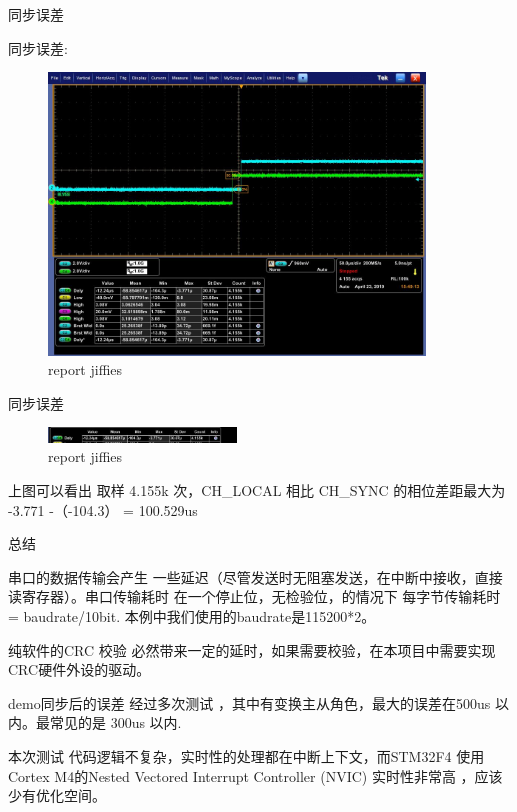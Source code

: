 \begin{frame}[fragile]{同步误差}

同步误差:

  \begin{figure}[htbp]
  \begin{center}
  \includegraphics[width=10cm]{img/mis3}
  \caption{report jiffies}
  \label{report}
  \end{center}
  \vspace{-0.5em}
  \end{figure}

\end{frame}


\begin{frame}[fragile]{同步误差}

  \begin{figure}[htbp]
  \begin{center}
  \includegraphics[width=5cm]{img/delay}
  \caption{report jiffies}
  \label{report}
  \end{center}
  \vspace{-0.5em}
  \end{figure}

上图可以看出 取样 4.155k 次，CH\_LOCAL 相比 CH\_SYNC 的相位差距最大为
-3.771 -（-104.3） = 100.529us

\end{frame}


\begin{frame}[fragile]{总结}

串口的数据传输会产生 一些延迟（尽管发送时无阻塞发送，在中断中接收，直接读寄存器）。串口传输耗时
在一个停止位，无检验位，的情况下 每字节传输耗时 =  baudrate/10bit. 本例中我们使用的baudrate是115200*2。

纯软件的CRC 校验 必然带来一定的延时，如果需要校验，在本项目中需要实现CRC硬件外设的驱动。

demo同步后的误差 经过多次测试 ，其中有变换主从角色，最大的误差在500us 以内。最常见的是
300us 以内.

本次测试 代码逻辑不复杂，实时性的处理都在中断上下文，而STM32F4 使用Cortex M4的Nested Vectored Interrupt Controller (NVIC) 实时性非常高 ，应该少有优化空间。

\end{frame}
